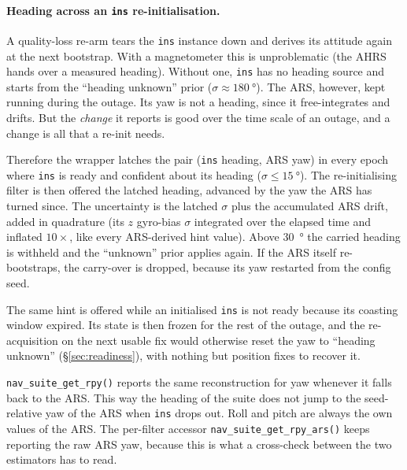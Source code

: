 \documentclass[11pt,a4paper]{article}
\newcommand{\code}[1]{\texttt{#1}}
\begin{document}
\paragraph{Heading across an \code{ins} re-initialisation.} A quality-loss
re-arm tears the \code{ins} instance down and derives its attitude again at the
next bootstrap. With a magnetometer this is unproblematic (the AHRS hands over a
measured heading). Without one, \code{ins} has no heading source and starts from
the ``heading unknown'' prior ($\sigma \approx \SI{180}{\degree}$). The ARS,
however, kept running during the outage. Its yaw is not a heading, since it
free-integrates and drifts. But the \emph{change} it reports is good over the
time scale of an outage, and a change is all that a re-init needs.

Therefore the wrapper latches the pair (\code{ins} heading, ARS yaw) in every
epoch where \code{ins} is ready and confident about its heading
($\sigma \le \SI{15}{\degree}$). The re-initialising filter is then offered the
latched heading, advanced by the yaw the ARS has turned since. The uncertainty
is the latched $\sigma$ plus the accumulated ARS drift, added in quadrature (its
$z$ gyro-bias $\sigma$ integrated over the elapsed time and inflated $10\times$,
like every ARS-derived hint value). Above \SI{30}{\degree} the carried heading
is withheld and the ``unknown'' prior applies again. If the ARS itself
re-bootstraps, the carry-over is dropped, because its yaw restarted from the
config seed.

The same hint is offered while an initialised \code{ins} is not ready because
its coasting window expired. Its state is then frozen for the rest of the
outage, and the re-acquisition on the next usable fix would otherwise reset
the yaw to ``heading unknown'' (\S\ref{sec:readiness}), with nothing but position
fixes to recover it.

\code{nav\_\allowbreak{}suite\_\allowbreak{}get\_\allowbreak{}rpy()} reports
the same reconstruction for yaw whenever it falls back to the ARS. This way the
heading of the suite does not jump to the seed-relative yaw of the ARS when
\code{ins} drops out. Roll and pitch are always the own values of the ARS. The
per-filter accessor
\code{nav\_\allowbreak{}suite\_\allowbreak{}get\_\allowbreak{}rpy\_\allowbreak{}ars()}
keeps reporting the raw ARS yaw, because this is what a cross-check between the
two estimators has to read.
\end{document}
